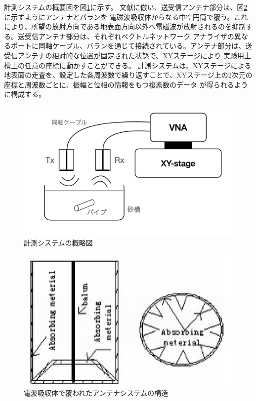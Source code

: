 \documentclass[11pt,a4paper,uplatex,draft]{ujarticle}
\begin{document}
    計測システムの概要図を図\ref{fig:XYstage_configuration}に示す。
    文献\cite{absorbing_material}に倣い、送受信アンテナ部分は、図\ref{fig:absorbing_material}に示すようにアンテナとバランを
    電磁波吸収体からなる中空円筒で覆う。これにより、所望の放射方向である地表面方向以外へ電磁波が放射されるのを抑制する。送受信アンテナ部分は、それぞれベクトルネットワーク
    アナライザの異なるポートに同軸ケーブル、バランを通じて接続されている。アンテナ部分は、送受信アンテナの相対的な位置が固定された状態で、XYステージにより
    実験用土槽上の任意の座標に動かすことができる。
    計測システムは、XYステージによる地表面の走査を、設定した各周波数で繰り返すことで、XYステージ上の2次元の座標と周波数ごとに、振幅と位相の情報をもつ複素数のデータ
    が得られるように構成する。

    \begin{figure}[hbtp]
      \centering
      \includegraphics[keepaspectratio, width=130mm]{Images/XYstage_configuration.png}
      \caption{計測システムの概略図}\label{fig:XYstage_configuration}
    \end{figure}

    \begin{figure}[hbtp]
      \centering
      \includegraphics[keepaspectratio, width=130mm]{Images/absorbing_material.png}
      \caption{電波吸収体で覆われたアンテナシステムの構造\cite{absorbing_material}}\label{fig:absorbing_material}
    \end{figure}
\end{document}

